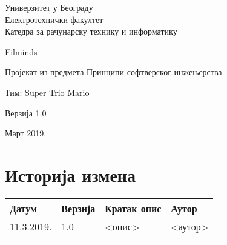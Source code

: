 \documentclass[12pt,a4paper]{article}
\begin{document}
\begin{titlepage}
\begin{center}
  Универзитет у Београду \\
  Електротехнички факултет \\
  Катедра за рачунарску технику и информатику \\
  \vfill

  {\fontsize{50}{60}\selectfont Filminds}
  \vskip 0.6cm

  {\large Пројекат из предмета Принципи софтверског инжењерства }
  \vskip 0.3cm

  {\large Тим: Super Trio Mario}
  \vskip 0.3cm

  {\large Верзија 1.0}

  \vfill
  \vfill

  Март 2019.
\hfill

\end{center}
\end{titlepage}

\section*{Историја измена}
\noindent
\setcellgapes{4pt}
\makegapedcells
\begin{tabularx}{\linewidth}{|l|l|X|X|}
    \hline
    \textbf{Датум} & \textbf{Верзија} & \textbf{Кратак опис} & \textbf{Аутор} \\
    \hline
    11.3.2019. & 1.0 & <опис> & <аутор> \\
    \hline
    & & & \\
    \hline
\end{tabularx}
\newpage

\tableofcontents
\newpage

\end{document}
